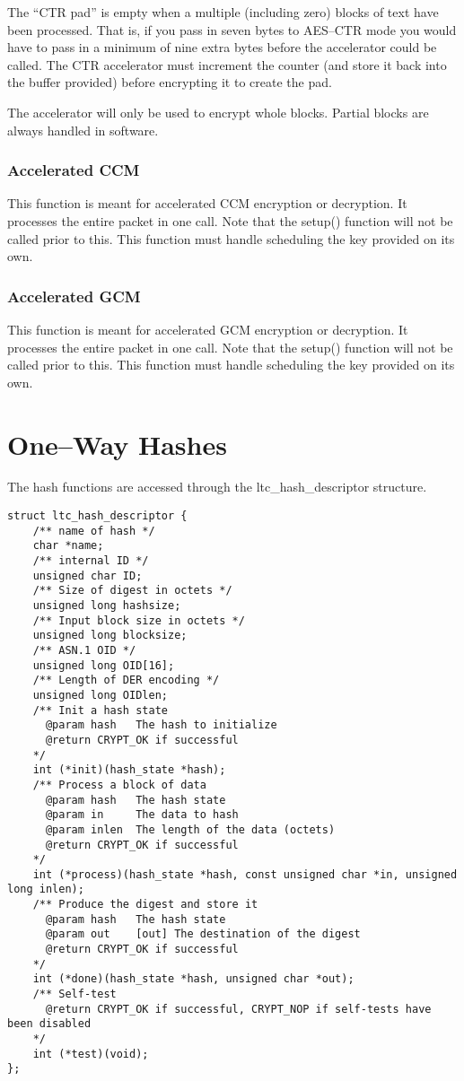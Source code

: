 \documentclass[a4paper]{book}
\begin{document}
The ``CTR pad'' is empty when a multiple (including zero) blocks of text have been processed.  That is, if you pass in seven bytes to AES--CTR mode you would have to 
pass in a minimum of nine extra bytes before the accelerator could be called.  The CTR accelerator must increment the counter (and store it back into the 
buffer provided) before encrypting it to create the pad.  

The accelerator will only be used to encrypt whole blocks.  Partial blocks are always handled in software.

\subsubsection{Accelerated CCM}
This function is meant for accelerated CCM encryption or decryption.  It processes the entire packet in one call.  Note that the setup() function will not
be called prior to this.  This function must handle scheduling the key provided on its own.

\subsubsection{Accelerated GCM}
This function is meant for accelerated GCM encryption or decryption.  It processes the entire packet in one call.  Note that the setup() function will not
be called prior to this.  This function must handle scheduling the key provided on its own.

\section{One--Way Hashes}
The hash functions are accessed through the ltc\_hash\_descriptor structure.

\begin{small}
\begin{verbatim}
struct ltc_hash_descriptor {
    /** name of hash */
    char *name;
    /** internal ID */
    unsigned char ID;
    /** Size of digest in octets */
    unsigned long hashsize;
    /** Input block size in octets */
    unsigned long blocksize;
    /** ASN.1 OID */
    unsigned long OID[16];
    /** Length of DER encoding */
    unsigned long OIDlen;
    /** Init a hash state
      @param hash   The hash to initialize
      @return CRYPT_OK if successful
    */
    int (*init)(hash_state *hash);
    /** Process a block of data 
      @param hash   The hash state
      @param in     The data to hash
      @param inlen  The length of the data (octets)
      @return CRYPT_OK if successful
    */
    int (*process)(hash_state *hash, const unsigned char *in, unsigned long inlen);
    /** Produce the digest and store it
      @param hash   The hash state
      @param out    [out] The destination of the digest
      @return CRYPT_OK if successful
    */
    int (*done)(hash_state *hash, unsigned char *out);
    /** Self-test
      @return CRYPT_OK if successful, CRYPT_NOP if self-tests have been disabled
    */
    int (*test)(void);
};
\end{verbatim}
\end{small}
\end{document}
